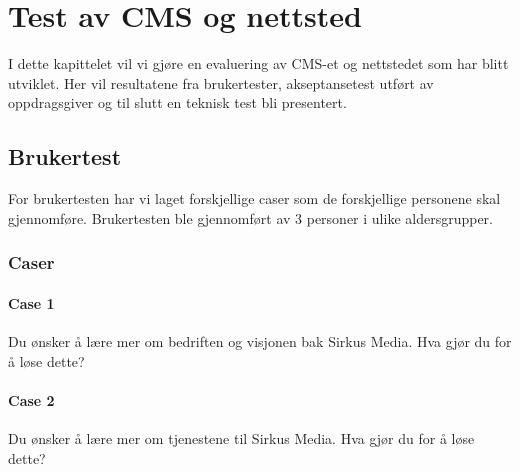 \cleardoublepage
\chapter{Test av CMS og nettsted}
\label{chap:evaluation} 


I dette kapittelet vil vi gjøre en evaluering av CMS-et og nettstedet som har blitt utviklet. Her vil resultatene fra brukertester, akseptansetest utført av oppdragsgiver og til slutt en teknisk test bli presentert.

\section{Brukertest}
For brukertesten har vi laget forskjellige caser som de forskjellige personene skal gjennomføre. Brukertesten ble gjennomført av 3 personer i ulike aldersgrupper.

\subsection{Caser}

\subsubsection{Case 1}
Du ønsker å lære mer om bedriften og visjonen bak Sirkus Media. Hva gjør du for å løse dette?

\subsubsection{Case 2}
Du ønsker å lære mer om tjenestene til Sirkus Media. Hva gjør du for å løse dette?

